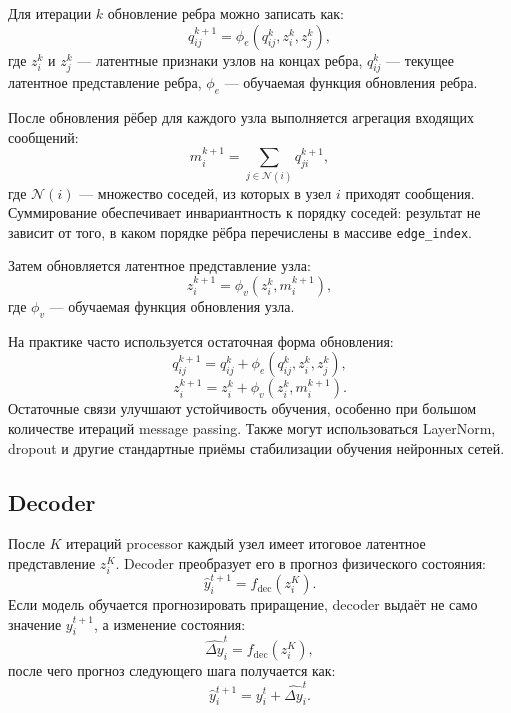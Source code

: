 Для итерации $k$ обновление ребра можно записать как:
\begin{equation}
    q_{ij}^{k+1}=\phi_e\left(q_{ij}^{k},z_i^k,z_j^k\right),
\end{equation}
где $z_i^k$ и $z_j^k$ --- латентные признаки узлов на концах ребра, $q_{ij}^{k}$ --- текущее латентное представление ребра, $\phi_e$ --- обучаемая функция обновления ребра.

После обновления рёбер для каждого узла выполняется агрегация входящих сообщений:
\begin{equation}
    m_i^{k+1}=\sum_{j\in\mathcal{N}(i)}q_{ji}^{k+1},
\end{equation}
где $\mathcal{N}(i)$ --- множество соседей, из которых в узел $i$ приходят сообщения. Суммирование обеспечивает инвариантность к порядку соседей: результат не зависит от того, в каком порядке рёбра перечислены в массиве \texttt{edge\_index}.

Затем обновляется латентное представление узла:
\begin{equation}
    z_i^{k+1}=\phi_v\left(z_i^k,m_i^{k+1}\right),
\end{equation}
где $\phi_v$ --- обучаемая функция обновления узла.

На практике часто используется остаточная форма обновления:
\begin{equation}
    q_{ij}^{k+1}=q_{ij}^{k}+\phi_e\left(q_{ij}^{k},z_i^k,z_j^k\right),
\end{equation}
\begin{equation}
    z_i^{k+1}=z_i^k+\phi_v\left(z_i^k,m_i^{k+1}\right).
\end{equation}
Остаточные связи улучшают устойчивость обучения, особенно при большом количестве итераций message passing. Также могут использоваться LayerNorm, dropout и другие стандартные приёмы стабилизации обучения нейронных сетей.

\subsection{Decoder}

После $K$ итераций processor каждый узел имеет итоговое латентное представление $z_i^K$. Decoder преобразует его в прогноз физического состояния:
\begin{equation}
    \hat{y}_i^{t+1}=f_{\mathrm{dec}}(z_i^K).
\end{equation}
Если модель обучается прогнозировать приращение, decoder выдаёт не само значение $y_i^{t+1}$, а изменение состояния:
\begin{equation}
    \widehat{\Delta y}_i^t=f_{\mathrm{dec}}(z_i^K),
\end{equation}
после чего прогноз следующего шага получается как:
\begin{equation}
    \hat{y}_i^{t+1}=y_i^t+\widehat{\Delta y}_i^t.
\end{equation}

